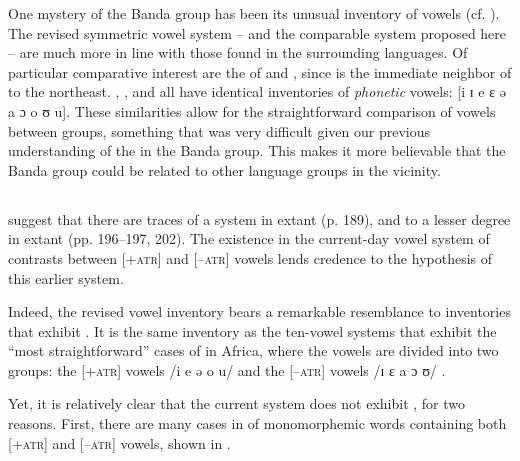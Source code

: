 \documentclass[output=paper,colorlinks,citecolor=brown]{langscibook}
\begin{document}
One mystery of the Banda  group has been its unusual inventory of vowels (cf. ). The revised symmetric  vowel system  -- and the comparable  system proposed here -- are much more in line with those found in the surrounding languages. Of particular comparative interest are the  of  and , since  is the immediate neighbor of  to the northeast. , , and  all have identical inventories of \textit{phonetic} vowels: [i ɪ e ɛ ə a ɔ o ʊ u]. These similarities allow for the straightforward comparison of vowels between groups, something that was very difficult given our previous understanding of the  in the Banda  group. This makes it more believable that the Banda  group could be related to other language groups in the vicinity.

\subsection{}

\citeauthor{BoyeldieuCloarec-Heiss2001} suggest that there are traces of a   system in extant  (p. 189), and to a lesser degree in extant  (pp. 196–197, 202). The existence in the current-day  vowel system of contrasts between [+\textsc{atr}] and [–\textsc{atr}] vowels lends credence to the hypothesis of this earlier  system.

Indeed, the revised  vowel inventory bears a remarkable resemblance to inventories that exhibit . It is the same inventory as the ten-vowel systems that exhibit the “most straightforward” cases of  in Africa, where the vowels are divided into two groups: the [+\textsc{atr}] vowels /i e ə o u/ and the [–\textsc{atr}] vowels /ɪ ɛ a ɔ ʊ/ \citep[499]{Casali2008}.

Yet, it is relatively clear that the current  system does not exhibit , for two reasons. First, there are many cases in  of monomorphemic words containing both [+\textsc{atr}] and [–\textsc{atr}] vowels, shown in .
\end{document}
